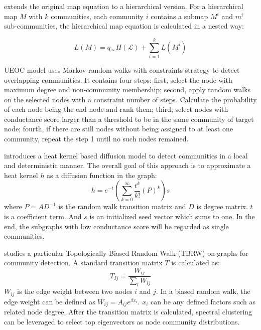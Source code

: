  \cite{rosvall2011multilevel} extends the original map equation to a hierarchical version. For a hierarchical map $M$ with $k$ communities, each community $i$ contains a submap $M^i$ and $m^i$ sub-communities, the hierarchical map equation is calculated in a nested way:
 
 \begin{equation}
 L(M)= q_{\curvearrowright}H(\mathcal{L})+\sum_{i=1}^{k} L(M^i)
 \end{equation}
 
UEOC model \cite{jin2011markov} uses Markov random walks with constraints strategy to detect overlapping communities. It contains four steps: first, select the node with maximum degree and non-community membership; second, apply random walks on the selected nodes with a constraint number of steps. Calculate the probability of each node being the end node and rank them; third, select nodes with conductance score larger than a threshold to be in the same community of target node; fourth, if there are still nodes without being assigned to at least one community, repeat the step 1 until no such nodes remained. 

\cite{kloster2014heat} introduces a heat kernel based diffusion model to detect communities in a local and deterministic manner. The overall goal of this approach is to approximate a heat kernel $h$ as a diffusion function in the graph:
\begin{equation}
h = e^{-t} \left (\sum_{k=0}^{\infty} \frac{t^k}{k!}(P)^{k}\right)s 
\end{equation}
where $P=AD^{-1}$ is the random walk transition matrix and $D$ is degree matrix. $t$ is a coefficient term. And $s$ is an initialized seed vector which sums to one. In the end, the subgraphs with low conductance score will be regarded as single communities.

\cite{zlatic2010topologically} studies a particular Topologically Biased Random Walk (TBRW) on graphs for community detection. A standard transition matrix $T$ is calculated as:
\begin{equation}
T_{Ij} = \frac{W_{ij}}{\sum_{l} W_{lj}}
\end{equation} 
$W_{ij}$ is the edge weight between two nodes $i$ and $j$. In a biased random walk, the edge weight can be defined as $W_{ij} = A_{ij}e^{\beta x_i}$. $x_i$ can be any defined factors such as related node degree. After the transition matrix is calculated, spectral clustering can be leveraged to select top eigenvectors as node community distributions.

